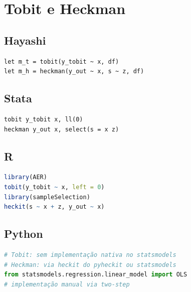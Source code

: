 \section{Tobit e Heckman}

\subsection*{Hayashi}

\begin{lstlisting}
let m_t = tobit(y_tobit ~ x, df)
let m_h = heckman(y_out ~ x, s ~ z, df)
\end{lstlisting}

\subsection*{Stata}

\begin{lstlisting}[language={}, basicstyle=\ttfamily\small,
  frame=single, numbers=none, backgroundcolor=\color{codbg}]
tobit y_tobit x, ll(0)
heckman y_out x, select(s = x z)
\end{lstlisting}

\subsection*{R}

\begin{lstlisting}[language=R, basicstyle=\ttfamily\small,
  frame=single, numbers=none, backgroundcolor=\color{codbg},
  keywordstyle=\color{keyword}\bfseries,
  stringstyle=\color{string},
  commentstyle=\color{comment}\itshape]
library(AER)
tobit(y_tobit ~ x, left = 0)
library(sampleSelection)
heckit(s ~ x + z, y_out ~ x)
\end{lstlisting}

\subsection*{Python}

\begin{lstlisting}[language=Python, basicstyle=\ttfamily\small,
  frame=single, numbers=none, backgroundcolor=\color{codbg},
  keywordstyle=\color{keyword}\bfseries,
  stringstyle=\color{string},
  commentstyle=\color{comment}\itshape]
# Tobit: sem implementação nativa no statsmodels
# Heckman: via heckit do pyheckit ou statsmodels
from statsmodels.regression.linear_model import OLS
# implementação manual via two-step
\end{lstlisting}

